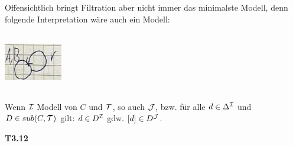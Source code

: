 Offensichtlich bringt Filtration aber nicht immer das minimalste Modell, denn folgende Interpretation wäre auch ein Modell:

\includegraphics[width=1.0in,height=1.0in]{media/314typcont2.png}

\begin{theorem} 
Wenn $\mathcal{I}$ Modell von $C$ und $\mathcal{T}$, so auch $\mathcal{J}$, bzw. für alle
$d \in \Delta^{\mathcal{I}}$ und $D \in sub(C,\mathcal{T})$ gilt: $d \in D^{\mathcal{I}}$ gdw.
$\left\lbrack d \right\rbrack \in D^{\mathcal{J}}$.
\end{theorem}

\textbf{T3.12}

